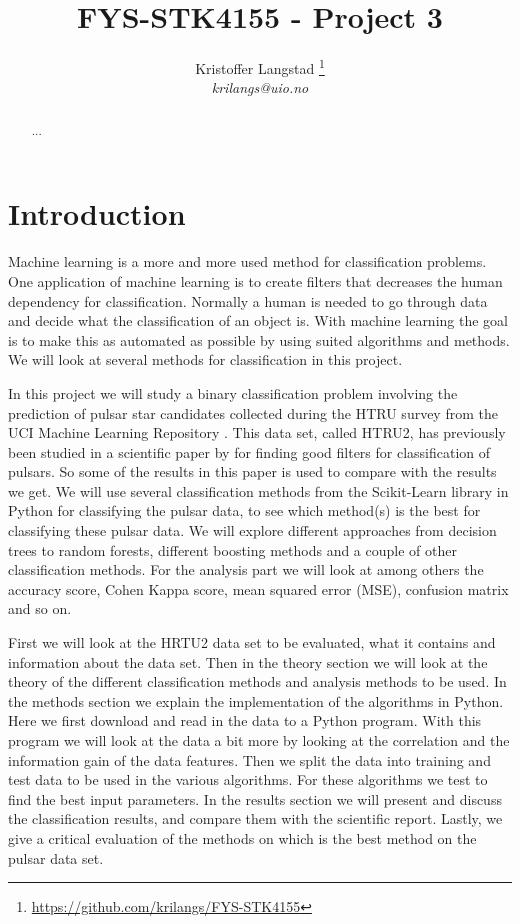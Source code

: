 \documentclass[12pt,a4paper,english]{article}
\title{FYS-STK4155 - Project 3}
\date{}
\author{ Kristoffer Langstad \footnote{\url{https://github.com/krilangs/FYS-STK4155}}\\ \textit{krilangs@uio.no}}
\begin{document}
\maketitle
\begin{abstract}
	...
\end{abstract}
\section{Introduction}
\label{sect:Introduction}
Machine learning is a more and more used method for classification problems. One application of machine learning is to create filters that decreases the human dependency for classification. Normally a human is needed to go through data and decide what the classification of an object is. With machine learning the goal is to make this as automated as possible by using suited algorithms and methods. We will look at several methods for classification in this project.

In this project we will study a binary classification problem involving the prediction of pulsar star candidates collected during the HTRU survey from the UCI Machine Learning Repository \cite{UCI}. This data set, called HTRU2, has previously been studied in a scientific paper by \citet{pulsar_art} for finding good filters for classification of pulsars. So some of the results in this paper is used to compare with the results we get. We will use several classification methods from the Scikit-Learn library in Python for classifying the pulsar data, to see which method(s) is the best for classifying these pulsar data. We will explore different approaches from decision trees to random forests, different boosting methods and a couple of other classification methods. For the analysis part we will look at among others the accuracy score, Cohen Kappa score, mean squared error (MSE), confusion matrix and so on.

First we will look at the HRTU2 data set to be evaluated, what it contains and information about the data set. Then in the theory section we will look at the theory of the different classification methods and analysis methods to be used. In the methods section we explain the implementation of the algorithms in Python. Here we first download and read in the data to a Python program. With this program we will look at the data a bit more by looking at the correlation and the information gain
of the data features. Then we split the data into training and test data to be used in the various algorithms. For these algorithms we test to find the best input parameters. In the results section we will present and discuss the classification results, and compare them with the scientific report. Lastly, we give a critical evaluation of the methods on which is the best method on the pulsar data set.
\end{document}
